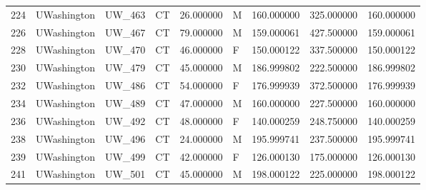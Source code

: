 \begin{tabular}{llllrlrrr}
224    &     UWashington &       UW\_463 &                 CT &  26.000000 &        M &       160.000000 &    325.000000 &  160.000000 \\
226    &     UWashington &       UW\_467 &                 CT &  79.000000 &        M &       159.000061 &    427.500000 &  159.000061 \\
228    &     UWashington &       UW\_470 &                 CT &  46.000000 &        F &       150.000122 &    337.500000 &  150.000122 \\
230    &     UWashington &       UW\_479 &                 CT &  45.000000 &        M &       186.999802 &    222.500000 &  186.999802 \\
232    &     UWashington &       UW\_486 &                 CT &  54.000000 &        F &       176.999939 &    372.500000 &  176.999939 \\
234    &     UWashington &       UW\_489 &                 CT &  47.000000 &        M &       160.000000 &    227.500000 &  160.000000 \\
236    &     UWashington &       UW\_492 &                 CT &  48.000000 &        F &       140.000259 &    248.750000 &  140.000259 \\
238    &     UWashington &       UW\_496 &                 CT &  24.000000 &        M &       195.999741 &    237.500000 &  195.999741 \\
239    &     UWashington &       UW\_499 &                 CT &  42.000000 &        F &       126.000130 &    175.000000 &  126.000130 \\
241    &     UWashington &       UW\_501 &                 CT &  45.000000 &        M &       198.000122 &    225.000000 &  198.000122 \\
\bottomrule
\end{tabular}
